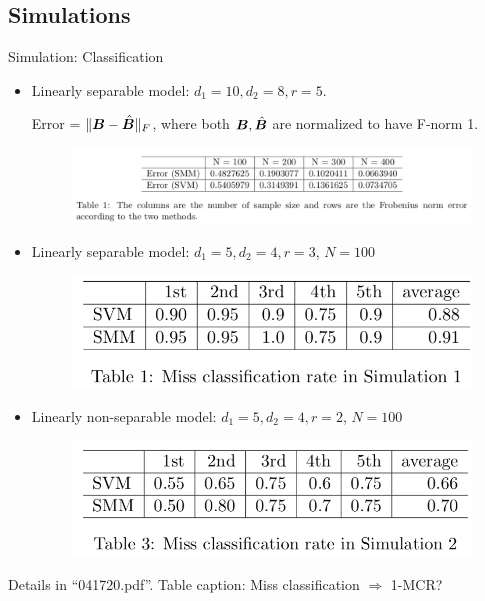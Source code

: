 \documentclass[compress,dvipsnames]{beamer}
\let\olditem\item
\renewcommand\item{\olditem\justifying}
\begin{document}
\subsection{Simulations}
\begin{frame}{Simulation: Classification}
\begin{itemize}
\item Linearly separable model: $d_1=10, d_2=8, r=5$. 

{\scriptsize Error = $\lVert\bm{B}-\hat {\bm{B}}\rVert_F$, where both $\bm{B}, \hat {\bm{B}}$ are normalized to have F-norm 1.}

\begin{figure}[H]
\centering
\includegraphics[width=.68\textwidth]{Table1}
\end{figure}

\item Linearly separable model: $d_1=5, d_2=4, r=3$, $N=100$
\begin{figure}[H]
\centering
\includegraphics[width=.4\textwidth]{Table2}
\end{figure}

\item Linearly non-separable model: $d_1=5, d_2=4, r=2$, $N=100$
\begin{figure}[H]
\centering
\includegraphics[width=.4\textwidth]{Table3}
\end{figure}
\end{itemize}

{\scriptsize Details in ``041720.pdf''. Table caption: Miss classification $\Rightarrow$ 1-MCR?}
\end{frame}
\end{document}

